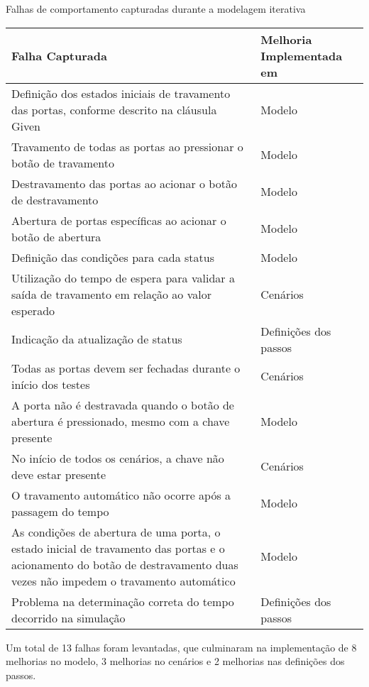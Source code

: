 \begin{quadro}[H]
\caption{Falhas de comportamento capturadas durante a modelagem iterativa}
\label{qua:falhas}
\begin{tabular}{|p{5cm}|p{7cm}|}
\hline
Falha Capturada & Melhoria Implementada em \\ 
\hline
Definição dos estados iniciais de travamento das portas, conforme descrito na cláusula Given & Modelo \\
\hline
Travamento de todas as portas ao pressionar o botão de travamento & Modelo \\
\hline
Destravamento das portas ao acionar o botão de destravamento & Modelo \\
\hline
Abertura de portas específicas ao acionar o botão de abertura & Modelo \\
\hline
Definição das condições para cada status & Modelo \\
\hline
Utilização do tempo de espera para validar a saída de travamento em relação ao valor esperado & Cenários \\
\hline
Indicação da atualização de status & Definições dos passos \\
\hline
Todas as portas devem ser fechadas durante o início dos testes & Cenários \\
\hline
A porta não é destravada quando o botão de abertura é pressionado, mesmo com a chave presente & Modelo \\
\hline
No início de todos os cenários, a chave não deve estar presente & Cenários \\
\hline
O travamento automático não ocorre após a passagem do tempo & Modelo \\
\hline
As condições de abertura de uma porta, o estado inicial de travamento das portas e o acionamento do botão de destravamento duas vezes não impedem o travamento automático & Modelo \\
\hline
Problema na determinação correta do tempo decorrido na simulação & Definições dos passos  \\
\hline
\end{tabular}
\end{quadro}

Um total de 13 falhas foram levantadas, que culminaram na implementação de 8 melhorias no modelo, 3 melhorias no cenários e 2 melhorias nas definições dos passos. 
